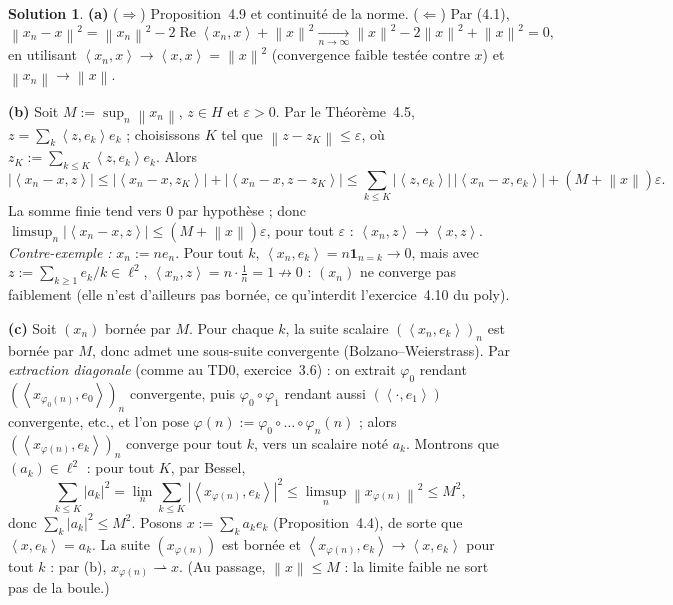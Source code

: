 \documentclass[11pt,a4paper]{article}
\newcommand{\norm}[1]{\left\|#1\right\|}
\newcommand{\ps}[2]{\left\langle #1,#2\right\rangle}
\renewcommand{\Re}{\operatorname{Re}}
\theoremstyle{definition}
\newtheorem*{solution}{Solution}
\begin{document}
\begin{solution}
\noindent\textbf{(a)} ($\Rightarrow$) Proposition~4.9 et continuité de la norme. ($\Leftarrow$) Par (4.1),
\[
\norm{x_n-x}^2=\norm{x_n}^2-2\Re\ps{x_n}x+\norm x^2\xrightarrow[n\to\infty]{}\norm x^2-2\norm x^2+\norm x^2=0 ,
\]
en utilisant $\ps{x_n}x\to\ps xx=\norm x^2$ (convergence faible testée contre $x$) et $\norm{x_n}\to\norm x$.

\medskip
\noindent\textbf{(b)} Soit $M:=\sup_n\norm{x_n}$, $z\in H$ et $\varepsilon>0$. Par le Théorème~4.5, $z=\sum_k\ps z{e_k}e_k$ ; choisissons $K$ tel que $\norm{z-z_K}\le\varepsilon$, où $z_K:=\sum_{k\le K}\ps z{e_k}e_k$. Alors
\[
|\ps{x_n-x}z|\le|\ps{x_n-x}{z_K}|+|\ps{x_n-x}{z-z_K}|\le\sum_{k\le K}|\ps z{e_k}|\,|\ps{x_n-x}{e_k}|+(M+\norm x)\varepsilon .
\]
La somme finie tend vers $0$ par hypothèse ; donc $\limsup_n|\ps{x_n-x}z|\le(M+\norm x)\varepsilon$, pour tout $\varepsilon$ : $\ps{x_n}z\to\ps xz$. \emph{Contre-exemple :} $x_n:=ne_n$. Pour tout $k$, $\ps{x_n}{e_k}=n\mathbf 1_{n=k}\to0$, mais avec $z:=\sum_{k\ge1}e_k/k\in\ell^2$, $\ps{x_n}z=n\cdot\frac1n=1\not\to0$ : $(x_n)$ ne converge pas faiblement (elle n'est d'ailleurs pas bornée, ce qu'interdit l'exercice~4.10 du poly).

\medskip
\noindent\textbf{(c)} Soit $(x_n)$ bornée par $M$. Pour chaque $k$, la suite scalaire $(\ps{x_n}{e_k})_n$ est bornée par $M$, donc admet une sous-suite convergente (Bolzano--Weierstrass). Par \emph{extraction diagonale} (comme au TD0, exercice~3.6) : on extrait $\varphi_0$ rendant $(\ps{x_{\varphi_0(n)}}{e_0})_n$ convergente, puis $\varphi_0\circ\varphi_1$ rendant aussi $(\ps{\cdot}{e_1})$ convergente, etc., et l'on pose $\varphi(n):=\varphi_0\circ\dots\circ\varphi_n(n)$ ; alors $(\ps{x_{\varphi(n)}}{e_k})_n$ converge pour tout $k$, vers un scalaire noté $a_k$. Montrons que $(a_k)\in\ell^2$ : pour tout $K$, par Bessel,
\[
\sum_{k\le K}|a_k|^2=\lim_n\sum_{k\le K}|\ps{x_{\varphi(n)}}{e_k}|^2\le\limsup_n\norm{x_{\varphi(n)}}^2\le M^2 ,
\]
donc $\sum_k|a_k|^2\le M^2$. Posons $x:=\sum_ka_ke_k$ (Proposition~4.4), de sorte que $\ps x{e_k}=a_k$. La suite $(x_{\varphi(n)})$ est bornée et $\ps{x_{\varphi(n)}}{e_k}\to\ps x{e_k}$ pour tout $k$ : par (b), $x_{\varphi(n)}\rightharpoonup x$. (Au passage, $\norm x\le M$ : la limite faible ne sort pas de la boule.)


\end{solution}
\end{document}
